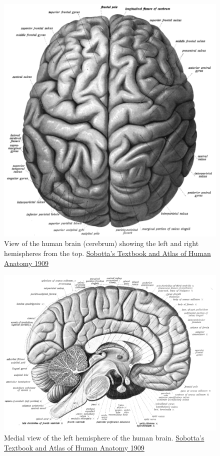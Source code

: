 \begin{figure}

{\centering \includegraphics[width=0.7\linewidth]{./figures/cns/Sobo_1909_628} 

}

\caption{View of the human brain (cerebrum) showing the left and right hemispheres from the top. \href{https://commons.wikimedia.org/wiki/File:Sobo_1909_628.png}{Sobotta's Textbook and Atlas of Human Anatomy 1909}}\label{fig:topview}
\end{figure}



\begin{figure}

{\centering \includegraphics[width=0.7\linewidth]{./figures/cns/Sobo_1909_624} 

}

\caption{Medial view of the left hemisphere of the human brain. \href{https://commons.wikimedia.org/wiki/File:Sobo_1909_624.png}{Sobotta's Textbook and Atlas of Human Anatomy 1909}}\label{fig:medialview}
\end{figure}



